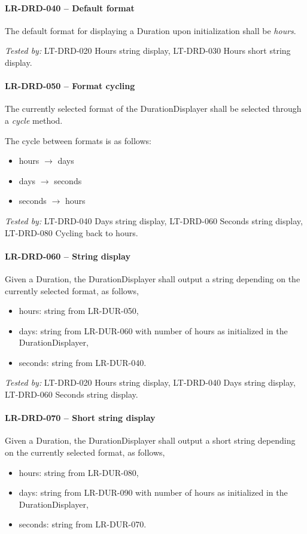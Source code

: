 \paragraph{LR-DRD-040 -- Default format}
The default format for displaying a Duration upon initialization shall
be \emph{hours}.

\textit{Tested by: } LT-DRD-020 Hours string display,
LT-DRD-030 Hours short string display.

\paragraph{LR-DRD-050 -- Format cycling}
The currently selected format of the DurationDisplayer shall be selected
through a \emph{cycle} method.

The cycle between formats is as follows:
\begin{itemize}
\item hours $\rightarrow$ days
\item days $\rightarrow$ seconds
\item seconds $\rightarrow$ hours
\end{itemize}

\textit{Tested by: } LT-DRD-040 Days string display,
LT-DRD-060 Seconds string display,
LT-DRD-080 Cycling back to hours.

\paragraph{LR-DRD-060 -- String display}
Given a Duration, the DurationDisplayer shall output a string depending
on the currently selected format, as follows,
\begin{itemize}
\item hours: string from LR-DUR-050,
\item days: string from LR-DUR-060 with number of hours as initialized in the
            DurationDisplayer,
\item seconds: string from LR-DUR-040.
\end{itemize}

\textit{Tested by: } LT-DRD-020 Hours string display,
LT-DRD-040 Days string display,
LT-DRD-060 Seconds string display.

\paragraph{LR-DRD-070 -- Short string display}
Given a Duration, the DurationDisplayer shall output a short string depending
on the currently selected format, as follows,
\begin{itemize}
\item hours: string from LR-DUR-080,
\item days: string from LR-DUR-090 with number of hours as initialized in the
            DurationDisplayer,
\item seconds: string from LR-DUR-070.
\end{itemize}

